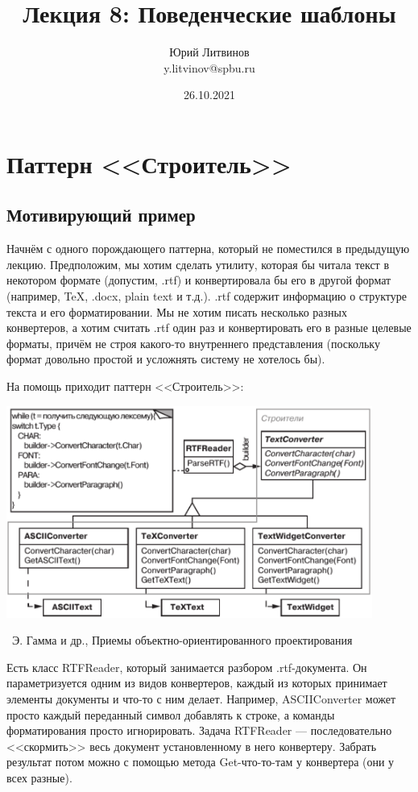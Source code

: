 \documentclass[a5paper]{article}
\title{Лекция 8: Поведенческие шаблоны}
\author{Юрий Литвинов\\\small{y.litvinov@spbu.ru}}
\date{26.10.2021}
\newcommand{\attribution}[1] {
    \vspace{-5mm}\begin{flushright}\begin{scriptsize}%
    {\textcopyright\, #1}\end{scriptsize}\end{flushright}
}
\begin{document}
\maketitle
\thispagestyle{empty}

\section{Паттерн <<Строитель>>}

\subsection{Мотивирующий пример}

Начнём с одного порождающего паттерна, который не поместился в предыдущую лекцию. Предположим, мы хотим сделать утилиту, которая бы читала текст в некотором формате (допустим, .rtf) и конвертировала бы его в другой формат (например, TeX, .docx, plain text и т.д.). .rtf содержит информацию о структуре текста и его форматировании. Мы не хотим писать несколько разных конвертеров, а хотим считать .rtf один раз и конвертировать его в разные целевые форматы, причём не строя какого-то внутреннего представления (поскольку формат довольно простой и усложнять систему не хотелось бы).

На помощь приходит паттерн <<Строитель>>:

\begin{center}
    \includegraphics[width=0.9\textwidth]{textConverter.png}
    \attribution{Э. Гамма и др., Приемы объектно-ориентированного проектирования}
\end{center}

Есть класс RTFReader, который занимается разбором .rtf-документа. Он параметризуется одним из видов конвертеров, каждый из которых принимает элементы документы и что-то с ним делает. Например, ASCIIConverter может просто каждый переданный символ добавлять к строке, а команды форматирования просто игнорировать. Задача RTFReader --- последовательно <<скормить>> весь документ установленному в него конвертеру. Забрать результат потом можно с помощью метода Get-что-то-там у конвертера (они у всех разные).
\end{document}
